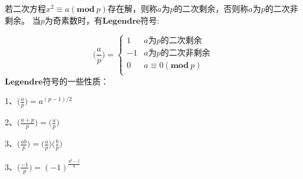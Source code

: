 \documentclass[12pt,a4paper,titlepage]{article}
\begin{document}
\begin{CJK}{UTF8}{gbsn}
	若二次方程$x^2\equiv a(\mathbf{mod}\ p)$存在解，则称$a$为$p$的二次剩余，否则称$a$为$p$的二次非剩余。
	当$p$为奇素数时，有$\mathbf{Legendre}$符号: \par
	\[ \Big (\frac{a}{p} \Big )= \left\{ 
		\begin{array}{ll}
			1  & \mbox{$a$为$p$的二次剩余} \\
			-1 & \mbox{$a$为$p$的二次非剩余} \\
			0  & \mbox{$a\equiv 0(\mathbf{mod}\  p)$} \\
		\end{array} \right. \] 
	$\mathbf{Legendre}$符号的一些性质：\par
	1、$\Big (\frac{a}{p} \Big )=a^{(p-1)/2}$ \par
	2、$\Big (\frac{a+p}{p} \Big )=\Big (\frac{a}{p}\Big )$ \par
	3、$\Big (\frac{ab}{p} \Big ) =\Big (\frac{a}{p} \Big )\Big ( \frac{b}{p} \Big )$ \par
	3、$\Big (\frac{-1}{p} \Big ) =(-1)^{\frac{p^2-1}{8}}$
\end{CJK}
\end{document}

